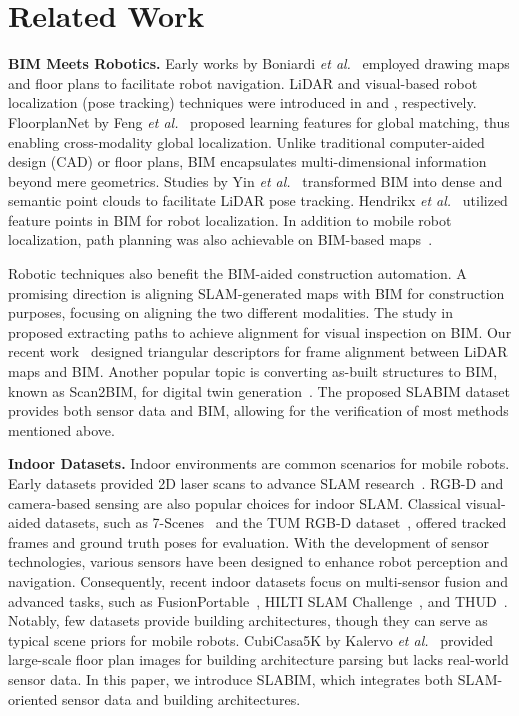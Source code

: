 \section{Related Work}
\label{sec:related work}

\textbf{BIM Meets Robotics.} Early works by Boniardi \textit{et al.}~\cite{boniardi2016autonomous,boniardi2019pose} employed drawing maps and floor plans to facilitate robot navigation. LiDAR and visual-based robot localization (pose tracking) techniques were introduced in \cite{li2020online} and \cite{chen2024f3loc}, respectively. FloorplanNet by Feng \textit{et al.}~\cite{feng2023floorplannet} proposed learning features for global matching, thus enabling cross-modality global localization. Unlike traditional computer-aided design
(CAD) or floor plans, BIM encapsulates multi-dimensional information beyond mere geometrics. Studies by Yin \textit{et al.}~\cite{yin2022towards,yin2023semantic} transformed BIM into dense and semantic point clouds to facilitate LiDAR pose tracking. Hendrikx \textit{et al.}~\cite{hendrikx2021connecting} utilized feature points in BIM for robot localization. In addition to mobile robot localization, path planning was also achievable on BIM-based maps~\cite{hamieh2020bim,kim2022bim}.

Robotic techniques also benefit the BIM-aided construction automation. A promising direction is aligning SLAM-generated maps with BIM for construction purposes, focusing on aligning the two different modalities. The study in~\cite{lu2021novel} proposed extracting paths to achieve alignment for visual inspection on BIM. Our recent work~\cite{qiao2024speak} designed triangular descriptors for frame alignment between LiDAR maps and BIM. Another popular topic is converting as-built structures to BIM, known as Scan2BIM, for digital twin generation~\cite{wang2022object,wang2024omni}. The proposed SLABIM dataset provides both sensor data and BIM, allowing for the verification of most methods mentioned above.

\textbf{Indoor Datasets.} Indoor environments are common scenarios for mobile robots. Early datasets provided 2D laser scans to advance SLAM research~\cite{Radish}. RGB-D and camera-based sensing are also popular choices for indoor SLAM. Classical visual-aided datasets, such as 7-Scenes~\cite{shotton2013scene} and the TUM RGB-D dataset~\cite{sturm2012benchmark}, offered tracked frames and ground truth poses for evaluation. With the development of sensor technologies, various sensors have been designed to enhance robot perception and navigation. Consequently, recent indoor datasets focus on multi-sensor fusion and advanced tasks, such as FusionPortable~\cite{jiao2022fusionportable}, HILTI SLAM Challenge~\cite{helmberger2022hilti}, and THUD~\cite{tang2024mobile}. Notably, few datasets provide building architectures, though they can serve as typical scene priors for mobile robots. CubiCasa5K by Kalervo \textit{et al.}~\cite{kalervo2019cubicasa5k} provided large-scale floor plan images for building architecture parsing but lacks real-world sensor data. In this paper, we introduce SLABIM, which integrates both SLAM-oriented sensor data and building architectures.